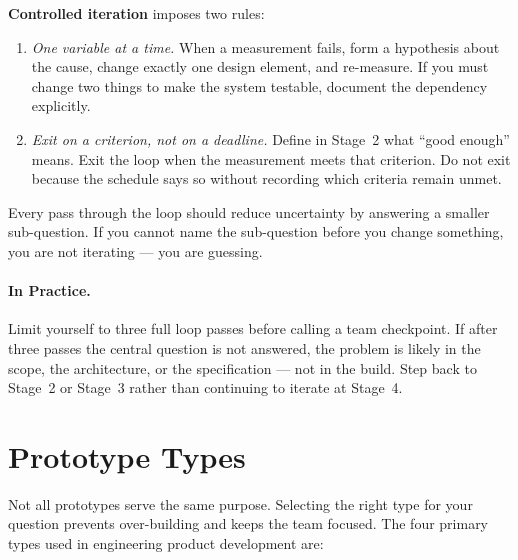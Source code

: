 \textbf{Controlled iteration} imposes two rules:
\begin{enumerate}
  \item \emph{One variable at a time.} When a measurement fails, form a
        hypothesis about the cause, change exactly one design element, and
        re-measure. If you must change two things to make the system testable,
        document the dependency explicitly.
  \item \emph{Exit on a criterion, not on a deadline.} Define in Stage~2
        what ``good enough'' means. Exit the loop when the measurement meets
        that criterion. Do not exit because the schedule says so without
        recording which criteria remain unmet.
\end{enumerate}

Every pass through the loop should reduce uncertainty by answering a smaller
sub-question. If you cannot name the sub-question before
you change something, you are not iterating --- you are guessing.

\paragraph{In Practice.}
Limit yourself to three full loop passes before calling a team checkpoint.
If after three passes the central question is not answered, the problem is
likely in the scope, the architecture, or the specification --- not in the
build.
Step back to Stage~2 or Stage~3 rather than continuing to iterate at
Stage~4.

\section{Prototype Types}
\label{sec:ch3-types}

Not all prototypes serve the same purpose.
Selecting the right type for your question prevents over-building and keeps
the team focused.
The four primary types used in engineering product development are:

